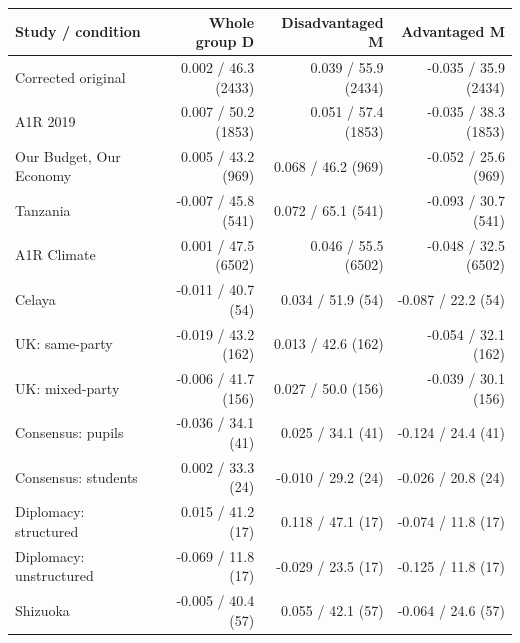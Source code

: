 
\begin{tabular}{lrrr}
\toprule
Study / condition & Whole group D & Disadvantaged M & Advantaged M\\
\midrule
Corrected original & 0.002 / 46.3 (2433) & 0.039 / 55.9 (2434) & -0.035 / 35.9 (2434)\\
A1R 2019 & 0.007 / 50.2 (1853) & 0.051 / 57.4 (1853) & -0.035 / 38.3 (1853)\\
Our Budget, Our Economy & 0.005 / 43.2 (969) & 0.068 / 46.2 (969) & -0.052 / 25.6 (969)\\
Tanzania & -0.007 / 45.8 (541) & 0.072 / 65.1 (541) & -0.093 / 30.7 (541)\\
A1R Climate & 0.001 / 47.5 (6502) & 0.046 / 55.5 (6502) & -0.048 / 32.5 (6502)\\
\addlinespace
Celaya & -0.011 / 40.7 (54) & 0.034 / 51.9 (54) & -0.087 / 22.2 (54)\\
UK: same-party & -0.019 / 43.2 (162) & 0.013 / 42.6 (162) & -0.054 / 32.1 (162)\\
UK: mixed-party & -0.006 / 41.7 (156) & 0.027 / 50.0 (156) & -0.039 / 30.1 (156)\\
Consensus: pupils & -0.036 / 34.1 (41) & 0.025 / 34.1 (41) & -0.124 / 24.4 (41)\\
Consensus: students & 0.002 / 33.3 (24) & -0.010 / 29.2 (24) & -0.026 / 20.8 (24)\\
\addlinespace
Diplomacy: structured & 0.015 / 41.2 (17) & 0.118 / 47.1 (17) & -0.074 / 11.8 (17)\\
Diplomacy: unstructured & -0.069 / 11.8 (17) & -0.029 / 23.5 (17) & -0.125 / 11.8 (17)\\
Shizuoka & -0.005 / 40.4 (57) & 0.055 / 42.1 (57) & -0.064 / 24.6 (57)\\
\bottomrule
\end{tabular}
